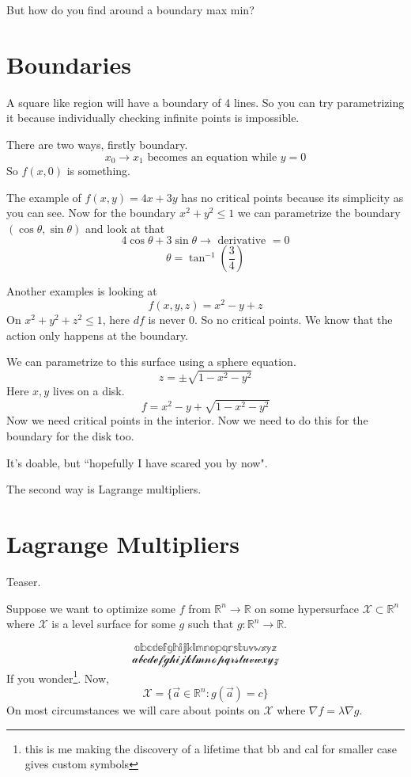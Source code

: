\documentclass[letter]{article}
\begin{document}
But how do you find around a boundary max min? 

\section*{Boundaries}
A square like region will have a boundary of 4 lines. So you can try parametrizing it because individually checking infinite points is impossible. 

There are two ways, firstly boundary. 
\[
	x_0 \to  x_1 \text{ becomes an equation while } y = 0
\]
So $f(x,0)$ is something.

The example of $f(x,y) = 4x + 3y$ has no critical points because its simplicity as you can see. Now for the boundary $x^2 + y^2 \le 1$ we can parametrize the boundary $(\cos \theta, \sin \theta)$ and look at that
\[
4 \cos \theta + 3 \sin \theta \to \text{ derivative } = 0 
\]
\[
\theta = \tan ^{-1} \left(\frac{3}{4}\right)
\]

Another examples is looking at 
\[
f(x,y,z) = x^2 - y + z
\] 
On $x^2 + y^2 + z^2 \le  1$, here $d f $ is never $0$. So no critical points. We know that the action only happens at the boundary. 

We can parametrize to this surface using a sphere equation. 
\[
z = \pm \sqrt{1 - x^2 - y^2} 
\] 
Here $x,y$ lives on a disk. 
\[
f = x^2 - y + \sqrt{1 - x^2 - y^2} 
\]
Now we need critical points in the interior. Now we need to do this for the boundary for the disk too. 

It's doable, but ``hopefully I have scared you by now". 

The second way is Lagrange multipliers. 

\section*{Lagrange Multipliers}
Teaser. 

Suppose we want to optimize some $f$ from $\mathbb{R}^{n} \to \mathbb{R}$ on some hypersurface $\mathcal X \subset \mathbb{R}^{n}$ where $\mathcal X$ is a level surface for some $g$ such that $g : \mathbb{R}^{n} \to \mathbb{R}$. 

$$
\mathbb{abcdefghijklmnopqrstuvwxyz} $$ $$ 
\mathcal{abcdefghijklmnopqrstuvwxyz}
$$
If you wonder\footnote{this is me making the discovery of a lifetime that bb and cal for smaller case gives custom symbols}.
Now, 
\[
\mathcal X = \{\vec{a} \in  \mathbb{R}^{n}: g(\vec{a}) = c\} 
\]
On most circumstances we will care about points on $\mathcal X$ where $\nabla f = \lambda \nabla g$. 
\end{document}
